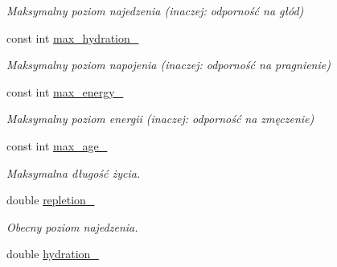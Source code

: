 \begin{DoxyCompactItemize}
\begin{DoxyCompactList}\small\item\em Maksymalny poziom najedzenia (inaczej\-: odporność na głód) \end{DoxyCompactList}\item 
\hypertarget{classcommon_1_1Creature_a2eb6497d81a27cb5fd40ad254a940dca}{const int \hyperlink{classcommon_1_1Creature_a2eb6497d81a27cb5fd40ad254a940dca}{max\-\_\-hydration\-\_\-}}\label{classcommon_1_1Creature_a2eb6497d81a27cb5fd40ad254a940dca}

\begin{DoxyCompactList}\small\item\em Maksymalny poziom napojenia (inaczej\-: odporność na pragnienie) \end{DoxyCompactList}\item 
\hypertarget{classcommon_1_1Creature_af76202c52941304ac19cba1ad51e6300}{const int \hyperlink{classcommon_1_1Creature_af76202c52941304ac19cba1ad51e6300}{max\-\_\-energy\-\_\-}}\label{classcommon_1_1Creature_af76202c52941304ac19cba1ad51e6300}

\begin{DoxyCompactList}\small\item\em Maksymalny poziom energii (inaczej\-: odporność na zmęczenie) \end{DoxyCompactList}\item 
\hypertarget{classcommon_1_1Creature_a79c9b6b2a9e7b580057ec18eff9222be}{const int \hyperlink{classcommon_1_1Creature_a79c9b6b2a9e7b580057ec18eff9222be}{max\-\_\-age\-\_\-}}\label{classcommon_1_1Creature_a79c9b6b2a9e7b580057ec18eff9222be}

\begin{DoxyCompactList}\small\item\em Maksymalna długość życia. \end{DoxyCompactList}\item 
\hypertarget{classcommon_1_1Creature_a247767f10ca5ceeac4d9c930f8e9a739}{double \hyperlink{classcommon_1_1Creature_a247767f10ca5ceeac4d9c930f8e9a739}{repletion\-\_\-}}\label{classcommon_1_1Creature_a247767f10ca5ceeac4d9c930f8e9a739}

\begin{DoxyCompactList}\small\item\em Obecny poziom najedzenia. \end{DoxyCompactList}\item 
\hypertarget{classcommon_1_1Creature_a75c8ffa7e45395c3b5d75357a758c59f}{double \hyperlink{classcommon_1_1Creature_a75c8ffa7e45395c3b5d75357a758c59f}{hydration\-\_\-}}\label{classcommon_1_1Creature_a75c8ffa7e45395c3b5d75357a758c59f}


\end{DoxyCompactItemize}
